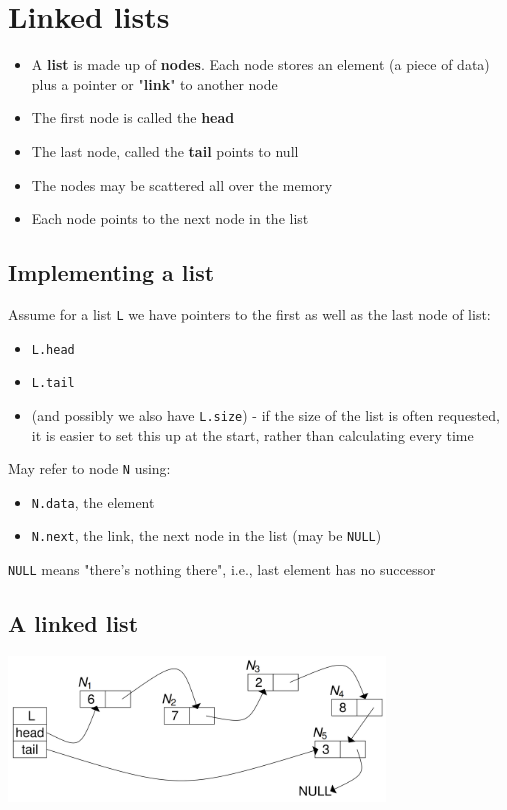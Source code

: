 \documentclass{article}[18pt]
\begin{document}
\section{Linked lists}
\begin{itemize}
\item A \textbf{list} is made up of \textbf{nodes}. Each node stores an element (a piece of data) plus a pointer or "\textbf{link}" to another node
\item The first node is called the \textbf{head}
\item The last node, called the \textbf{tail} points to null
\item The nodes may be scattered all over the memory
\item Each node points to the next node in the list
\end{itemize}
\subsection{Implementing a list}
Assume for a list \texttt{L} we have pointers to the first as well as the last node of list:
\begin{itemize}
\item \texttt{L.head}
\item \texttt{L.tail}
\item (and possibly we also have \texttt{L.size}) - if the size of the list is often requested, it is easier to set this up at the start, rather than calculating every time
\end{itemize}
May refer to node \texttt{N} using:
\begin{itemize}
\item \texttt{N.data}, the element
\item \texttt{N.next}, the link, the next node in the list (may be \texttt{NULL})
\end{itemize}
\texttt{NULL} means "there's nothing there", i.e., last element has no successor
\subsection{A linked list}
\includegraphics[width=10cm]{Linked_List.png}
\end{document}
